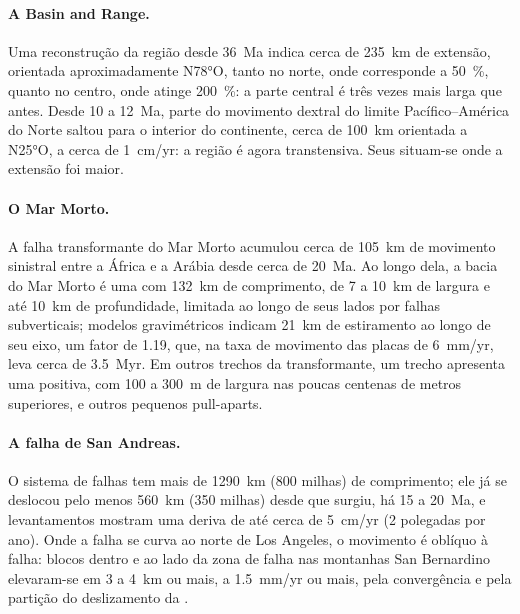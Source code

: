 \paragraph{A Basin and Range.} Uma reconstrução da região desde
\qty{36}{Ma} indica cerca de \qty{235}{km} de extensão, orientada aproximadamente
N\ang{78}O, tanto no norte, onde corresponde a \qty{50}{\percent}, quanto
no centro, onde atinge \qty{200}{\percent}: a parte central é três
vezes mais larga que antes. Desde 10 a \qty{12}{Ma}, parte do movimento dextral
do limite Pacífico--América do Norte saltou para o interior do continente,
cerca de \qty{100}{km} orientada a N\ang{25}O, a cerca de \qty{1}{cm/yr}: a região é
agora transtensiva. Seus  situam-se onde a extensão foi maior.

\paragraph{O Mar Morto.} A falha transformante do Mar Morto acumulou cerca de
\qty{105}{km} de movimento sinistral entre a África e a Arábia desde cerca de
\qty{20}{Ma}. Ao longo dela, a bacia do Mar Morto é uma  com \qty{132}{km}
de comprimento, de 7 a \qty{10}{km} de largura e até \qty{10}{km} de profundidade, limitada ao longo de
seus lados por falhas subverticais; modelos gravimétricos indicam \qty{21}{km} de estiramento
ao longo de seu eixo, um fator de 1.19, que, na taxa de movimento das placas de
\qty{6}{mm/yr}, leva cerca de \qty{3.5}{Myr}. Em outros trechos da transformante, um
trecho apresenta uma  positiva, com 100 a \qty{300}{m} de largura nas
poucas centenas de metros superiores, e outros pequenos pull-aparts.

\paragraph{A falha de San Andreas.} O sistema de falhas tem mais de \qty{1290}{km}
(800 milhas) de comprimento; ele já se deslocou pelo menos \qty{560}{km} (350 milhas) desde que
surgiu, há 15 a \qty{20}{Ma}, e levantamentos mostram uma deriva de até cerca de
\qty{5}{cm/yr} (2 polegadas por ano). Onde a falha se curva ao norte de Los Angeles, o
movimento é oblíquo à falha: blocos dentro e ao lado da zona de falha nas
montanhas San Bernardino elevaram-se em 3 a \qty{4}{km} ou mais, a
\qty{1.5}{mm/yr} ou mais, pela convergência e pela partição do deslizamento da
.

